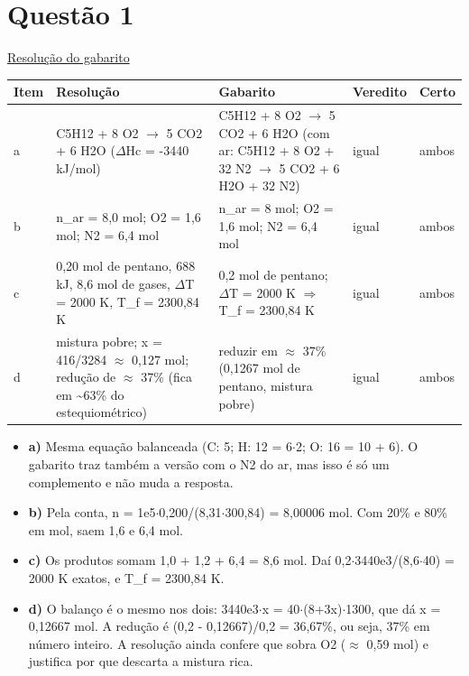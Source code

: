 \documentclass{article}%
\begin{document}
\section*{Questão 1}%
\href{https://poliedroresolve.sistemapoliedro.com.br/vestibulares/ita/2027/ita-2-fase-dia-2-21-10-2026-2-fase-dia-2/dissertativa-1-quimica-2-fase-dia-2-ita-2027}{Resolução do gabarito}\par\smallskip%
\begin{longtable}{@{}p{} p{} p{} p{} p{}@{}}\toprule Item & Resolução & Gabarito & Veredito & Certo \\ \midrule
a & C5H12 + 8 O2 $\to$ 5 CO2 + 6 H2O ($\Delta$Hc = -3440 kJ/mol) & C5H12 + 8 O2 $\to$ 5 CO2 + 6 H2O (com ar: C5H12 + 8 O2 + 32 N2 $\to$ 5 CO2 + 6 H2O + 32 N2) & igual & ambos \\
b & n\_ar = 8,0 mol; O2 = 1,6 mol; N2 = 6,4 mol & n\_ar = 8 mol; O2 = 1,6 mol; N2 = 6,4 mol & igual & ambos \\
c & 0,20 mol de pentano, 688 kJ, 8,6 mol de gases, $\Delta$T = 2000 K, T\_f = 2300,84 K & 0,2 mol de pentano; $\Delta$T = 2000 K $\Rightarrow$ T\_f = 2300,84 K & igual & ambos \\
d & mistura pobre; x = 416/3284 $\approx$ 0,127 mol; redução de $\approx$ 37\% (fica em \textasciitilde{}63\% do estequiométrico) & reduzir em $\approx$ 37\% (0,1267 mol de pentano, mistura pobre) & igual & ambos \\
\bottomrule\end{longtable}%
\begin{itemize}%
\item%
\textbf{a)} Mesma equação balanceada (C: 5; H: 12 = 6$\cdot$2; O: 16 = 10 + 6). O gabarito traz também a versão com o N2 do ar, mas isso é só um complemento e não muda a resposta.%
\item%
\textbf{b)} Pela conta, n = 1e5$\cdot$0,200/(8,31$\cdot$300,84) = 8,00006 mol. Com 20\% e 80\% em mol, saem 1,6 e 6,4 mol.%
\item%
\textbf{c)} Os produtos somam 1,0 + 1,2 + 6,4 = 8,6 mol. Daí 0,2$\cdot$3440e3/(8,6$\cdot$40) = 2000 K exatos, e T\_f = 2300,84 K.%
\item%
\textbf{d)} O balanço é o mesmo nos dois: 3440e3$\cdot$x = 40$\cdot$(8+3x)$\cdot$1300, que dá x = 0,12667 mol. A redução é (0,2 - 0,12667)/0,2 = 36,67\%, ou seja, 37\% em número inteiro. A resolução ainda confere que sobra O2 ($\approx$ 0,59 mol) e justifica por que descarta a mistura rica.%
\end{itemize}%
\end{document}
